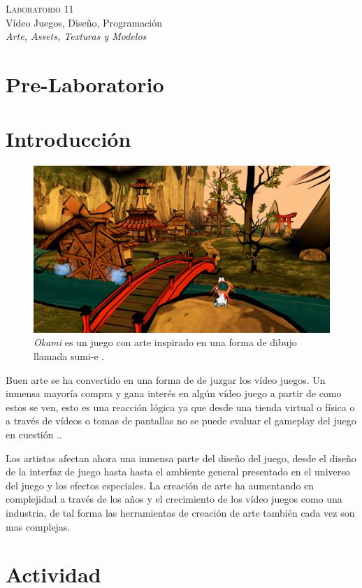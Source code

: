 \begin{center}
\textsc{\Large Laboratorio 11}~\\
{\large Vídeo Juegos, Diseño, Programación}~\\
\emph{Arte, Assets, Texturas y Modelos}
\end{center}

\section{Pre-Laboratorio}

\section{Introducción}
\setlength\intextsep{0pt}
\begin{figure}
\includegraphics[width=\linewidth]{semana11/okamips2.jpg}
\caption{\emph{Okami} \cite{okami} es un juego con arte inspirado en una forma de dibujo llamada sumi-e \cite{sumie}.}
\label{fig:particles}
\end{figure}
Buen arte se ha convertido en una forma de de juzgar los vídeo juegos. Un inmensa mayoría compra y gana interés en algún vídeo juego a partir de como estos se ven, esto es una reacción lógica ya que desde una tienda virtual o física o a través de vídeos o tomas de pantallas no se puede evaluar el gameplay del juego en cuestión \cite[p.~171]{bobbatesgamedesign}..

Los artistas afectan ahora una inmensa parte del diseño del juego, desde el diseño de la interfaz de juego hasta hasta el ambiente general presentado en el universo del juego y los efectos especiales. La creación de arte ha aumentando en complejidad a través de los años y el crecimiento de los vídeo juegos como una industria, de tal forma las herramientas de creación de arte también cada vez son mas complejas.
\section{Actividad}

